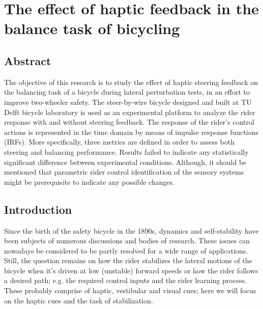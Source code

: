 \chapter{The effect of haptic feedback in the balance task of bicycling}\label{chapter 5}




\section{Abstract}

The objective of this research is to study the effect of haptic steering feedback on the balancing task of a bicycle during lateral perturbation tests, in an effort to improve two-wheeler safety. The steer-by-wire bicycle designed and built at TU Delft bicycle laboratory is used as an experimental platform to analyze the rider response with and without steering feedback. The response of the rider's control actions is represented in the time domain by means of impulse response functions (IRFs). More specifically, three metrics are defined  in order to assess both steering and balancing performance. Results failed to indicate any statistically significant difference between experimental conditions. Although, it should be mentioned that parametric rider control identification of the  sensory systems might be prerequisite to indicate any possible changes.


\section{Introduction}

Since the birth of the safety bicycle in the 1890s, dynamics and self-stability have been subjects of numerous discussions and bodies of research. These issues can nowadays be considered to be partly resolved \cite{kooijman2011bicycle} for a wide range of applications. Still, the question remains on how the rider stabilizes the lateral motions of the bicycle when it's driven at low (unstable) forward speeds or how the rider follows a desired path; e.g. the required control inputs and the rider learning process. These probably comprise of haptic, vestibular and visual cues; here we will focus on the haptic cues and the task of stabilization. 

